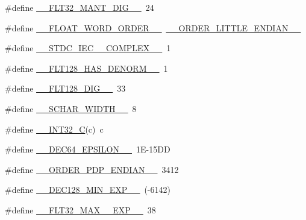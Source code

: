 \begin{DoxyCompactItemize}
\item 
\#define \hyperlink{cmake-build-debug_2babel__client__autogen_2moc__predefs_8h_a4d4e419b93a42fbd34e0f4ae3640c4a9}{\+\_\+\+\_\+\+F\+L\+T32\+\_\+\+M\+A\+N\+T\+\_\+\+D\+I\+G\+\_\+\+\_\+}~24
\item 
\#define \hyperlink{cmake-build-debug_2babel__client__autogen_2moc__predefs_8h_a2db444477ad8f9aa0759310d46694339}{\+\_\+\+\_\+\+F\+L\+O\+A\+T\+\_\+\+W\+O\+R\+D\+\_\+\+O\+R\+D\+E\+R\+\_\+\+\_\+}~\hyperlink{cmake-build-debug_2babel__client__autogen_2moc__predefs_8h_a2b695357ce4b46971d54e8e9dfe5724f}{\+\_\+\+\_\+\+O\+R\+D\+E\+R\+\_\+\+L\+I\+T\+T\+L\+E\+\_\+\+E\+N\+D\+I\+A\+N\+\_\+\+\_\+}
\item 
\#define \hyperlink{cmake-build-debug_2babel__client__autogen_2moc__predefs_8h_a7b5b9dc07de6dd5c39c59b0ac260f943}{\+\_\+\+\_\+\+S\+T\+D\+C\+\_\+\+I\+E\+C\+\_\+\_\+\+C\+O\+M\+P\+L\+E\+X\+\_\+\+\_\+}~1
\item 
\#define \hyperlink{cmake-build-debug_2babel__client__autogen_2moc__predefs_8h_a78ed6a6fd2aa3ae6c665c7f8b4b6797e}{\+\_\+\+\_\+\+F\+L\+T128\+\_\+\+H\+A\+S\+\_\+\+D\+E\+N\+O\+R\+M\+\_\+\+\_\+}~1
\item 
\#define \hyperlink{cmake-build-debug_2babel__client__autogen_2moc__predefs_8h_a3bc6597592a4ad7d7f73b673fbc7336a}{\+\_\+\+\_\+\+F\+L\+T128\+\_\+\+D\+I\+G\+\_\+\+\_\+}~33
\item 
\#define \hyperlink{cmake-build-debug_2babel__client__autogen_2moc__predefs_8h_a5a949d2ee22a649377e5bec02e3e5855}{\+\_\+\+\_\+\+S\+C\+H\+A\+R\+\_\+\+W\+I\+D\+T\+H\+\_\+\+\_\+}~8
\item 
\#define \hyperlink{cmake-build-debug_2babel__client__autogen_2moc__predefs_8h_a3ef70e13cfbe3264fe0b212f8f46d76c}{\+\_\+\+\_\+\+I\+N\+T32\+\_\+C}(c)~c
\item 
\#define \hyperlink{cmake-build-debug_2babel__client__autogen_2moc__predefs_8h_a189bb13aac101f45c8ac7f6e52daccfa}{\+\_\+\+\_\+\+D\+E\+C64\+\_\+\+E\+P\+S\+I\+L\+O\+N\+\_\+\+\_\+}~1\+E-\/15\+DD
\item 
\#define \hyperlink{cmake-build-debug_2babel__client__autogen_2moc__predefs_8h_a94ead674b2441dc29dbd5d6aba467197}{\+\_\+\+\_\+\+O\+R\+D\+E\+R\+\_\+\+P\+D\+P\+\_\+\+E\+N\+D\+I\+A\+N\+\_\+\+\_\+}~3412
\item 
\#define \hyperlink{cmake-build-debug_2babel__client__autogen_2moc__predefs_8h_a748143fe17201c420b868b8f30c57d59}{\+\_\+\+\_\+\+D\+E\+C128\+\_\+\+M\+I\+N\+\_\+\+E\+X\+P\+\_\+\+\_\+}~(-\/6142)
\item 
\#define \hyperlink{cmake-build-debug_2babel__client__autogen_2moc__predefs_8h_a935ebe200313334107dd681186ee586e}{\+\_\+\+\_\+\+F\+L\+T32\+\_\+\+M\+A\+X\+\_\+\_\+\+E\+X\+P\+\_\+\+\_\+}~38

\end{DoxyCompactItemize}
